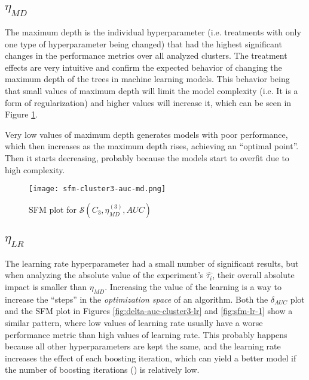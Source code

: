 \subsection{\texorpdfstring{\Large$\eta_{MD}$}{}}
\label{subsec:analysis-md}

The maximum depth is the individual hyperparameter (i.e. treatments with only one type of hyperparameter being changed) that had the highest significant changes in the performance metrics over all analyzed clusters. The treatment effects are very intuitive and confirm the expected behavior of changing the maximum depth of the trees in machine learning models. This behavior being that small values of maximum depth will limit the model complexity (i.e. It is a form of regularization) and higher values will increase it, which can be seen in Figure \ref{fig:sfm-md-1}.

Very low values of maximum depth generates models with poor performance, which then increases as the maximum depth rises, achieving an ``optimal point''. Then it starts decreasing, probably because the models start to overfit due to high complexity.

\begin{figure}[H]
    \centering
    \texttt{[image: sfm-cluster3-auc-md.png]}
    \caption{SFM plot for $\mathcal{S}(C_3, \eta^{(3)}_{MD}, AUC)$}
    \label{fig:sfm-md-1}
\end{figure}


\subsection{\texorpdfstring{\Large$\eta_{LR}$}{}}

The learning rate hyperparameter had a small number of significant results, but when analyzing the absolute value of the experiment's $\hat{\tau_i}$, their overall absolute impact is smaller than $\eta_{MD}$. Increasing the value of the learning is a way to increase the ``steps'' in the \textit{optimization space} of an algorithm. Both the $\delta_{AUC}$ plot and the SFM plot in Figures \ref{fig:delta-auc-cluster3-lr} and \ref{fig:sfm-lr-1} show a similar pattern, where low values of learning rate usually have a worse performance metric than high values of learning rate. This probably happens because all other hyperparameters are kept the same, and the learning rate increases the effect of each boosting iteration, which can yield a better model if the number of boosting iterations () is relatively low.

